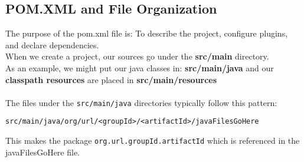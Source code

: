 \documentclass[12pt]{extarticle}
\theoremstyle{plain}
\theoremstyle{Definition}
\theoremstyle{Definition}
\theoremstyle{plain}
\begin{document}
	\subsection{POM.XML and File Organization} 
		The purpose of the pom.xml file is: To describe the project, configure plugins, and declare dependencies. \\
		When we create a project, our sources go under the \textbf{src/main} directory. \\ 
		As an example, we might put our java classes in: \textbf{src/main/java} and our \textbf{classpath resources} are placed in \textbf{src/main/resources} \\ \\
		The files under the \verb|src/main/java| directories typically follow this pattern: \\ 
		\begin{center}
			\verb|src/main/java/org/url/<groupId>/<artifactId>/javaFilesGoHere|
		\end{center}
		This makes the package \verb|org.url.groupId.artifactId| which is referenced in the javaFilesGoHere file. 
\end{document}
